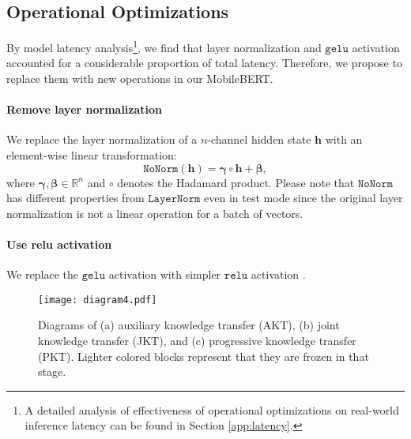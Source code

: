 \documentclass[11pt,a4paper]{article}
\begin{document}
\subsection{Operational Optimizations}\label{sec:opt}
By model latency analysis\footnote{A detailed analysis of effectiveness of operational optimizations on real-world inference latency can be found in Section \ref{app:latency}.}, we find that layer normalization \citep{ba2016layer} and $\mathtt{gelu}$ activation \citep{hendrycks2016bridging} accounted for a considerable proportion of total latency. Therefore, we propose to replace them with new operations in our MobileBERT.
\paragraph{Remove layer normalization} We replace the layer normalization of a $n$-channel hidden state $\mathbf{h}$ with an element-wise linear transformation:
\begin{equation}
    \mathtt{NoNorm}(\mathbf{h}) = \boldsymbol{\gamma} \circ \mathbf{h} + \boldsymbol{\beta},
\end{equation}
where $\boldsymbol{\gamma}, \boldsymbol{\beta} \in \mathbb{R}^{n}$ 
and $\circ$ denotes the Hadamard product. Please note that $\mathtt{NoNorm}$ has different properties from $\mathtt{LayerNorm}$ even in test mode since the original layer normalization is not a linear operation for a batch of vectors.
\paragraph{Use relu activation} We replace the $\mathtt{gelu}$ activation with simpler $\mathtt{relu}$ activation \citep{nair2010rectified}.

\makeatletter
\newcommand{\removelatexerror}{\let\@latex@error\@gobble}
\makeatother

\newcommand\mycommfont[1]{\scriptsize\ttfamily{#1}}

\begin{figure*}[t]
\begin{small}
\centering
\texttt{[image: diagram4.pdf]}
\end{small}
  \vspace{-1.5em}
  \caption{Diagrams of (a) auxiliary knowledge transfer (AKT), (b) joint knowledge transfer (JKT), and (c) progressive knowledge transfer (PKT). Lighter colored blocks represent that they are frozen in that stage. 
}
\label{fig:diagram}
\end{figure*}
\end{document}

